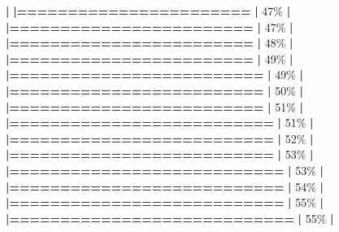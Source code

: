 \documentclass[
]{book}
\newenvironment{Shaded}{\begin{snugshade}}{\end{snugshade}}
\newcommand{\DecValTok}[1]{\textcolor[rgb]{0.00,0.00,0.81}{#1}}
\newcommand{\ErrorTok}[1]{\textcolor[rgb]{0.64,0.00,0.00}{\textbf{#1}}}
\newcommand{\NormalTok}[1]{#1}
\newcommand{\SpecialCharTok}[1]{\textcolor[rgb]{0.81,0.36,0.00}{\textbf{#1}}}
\begin{document}
\begin{Shaded}
\begin{Highlighting}[]
  \SpecialCharTok{|}                                                        
  \ErrorTok{|=======================}                           \ErrorTok{|}  \DecValTok{47}\NormalTok{\%}
  \SpecialCharTok{|}                                                        
  \ErrorTok{|========================}                          \ErrorTok{|}  \DecValTok{47}\NormalTok{\%}
  \SpecialCharTok{|}                                                        
  \ErrorTok{|========================}                          \ErrorTok{|}  \DecValTok{48}\NormalTok{\%}
  \SpecialCharTok{|}                                                        
  \ErrorTok{|========================}                          \ErrorTok{|}  \DecValTok{49}\NormalTok{\%}
  \SpecialCharTok{|}                                                        
  \ErrorTok{|=========================}                         \ErrorTok{|}  \DecValTok{49}\NormalTok{\%}
  \SpecialCharTok{|}                                                        
  \ErrorTok{|=========================}                         \ErrorTok{|}  \DecValTok{50}\NormalTok{\%}
  \SpecialCharTok{|}                                                        
  \ErrorTok{|=========================}                         \ErrorTok{|}  \DecValTok{51}\NormalTok{\%}
  \SpecialCharTok{|}                                                        
  \ErrorTok{|==========================}                        \ErrorTok{|}  \DecValTok{51}\NormalTok{\%}
  \SpecialCharTok{|}                                                        
  \ErrorTok{|==========================}                        \ErrorTok{|}  \DecValTok{52}\NormalTok{\%}
  \SpecialCharTok{|}                                                        
  \ErrorTok{|==========================}                        \ErrorTok{|}  \DecValTok{53}\NormalTok{\%}
  \SpecialCharTok{|}                                                        
  \ErrorTok{|===========================}                       \ErrorTok{|}  \DecValTok{53}\NormalTok{\%}
  \SpecialCharTok{|}                                                        
  \ErrorTok{|===========================}                       \ErrorTok{|}  \DecValTok{54}\NormalTok{\%}
  \SpecialCharTok{|}                                                        
  \ErrorTok{|===========================}                       \ErrorTok{|}  \DecValTok{55}\NormalTok{\%}
  \SpecialCharTok{|}                                                        
  \ErrorTok{|============================}                      \ErrorTok{|}  \DecValTok{55}\NormalTok{\%}
  \SpecialCharTok{|}                                                        

\end{Highlighting}
\end{Shaded}
\end{document}
